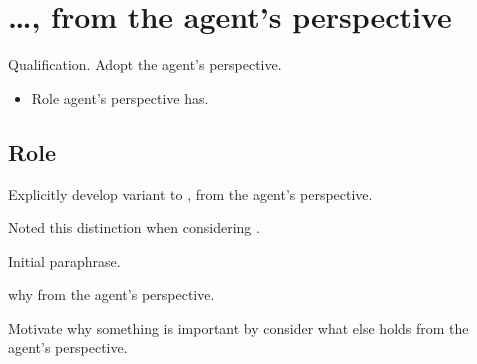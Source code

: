 \section{\dots, from the agent's perspective}
\label{cha:introduction:sec:agents-perspective}

\begin{note}
  Qualification.
  Adopt the agent's perspective.

  \begin{itemize}
  \item
    Role agent's perspective has.
  \end{itemize}
\end{note}


\subsection{Role}
\label{sec:role}

\begin{note}
  Explicitly develop variant to \qWhy{}, from the agent's perspective.

  Noted this distinction when considering \citeauthor{Davidson:1963aa}.

  Initial paraphrase.

  why from the agent's perspective.

  Motivate why something is important by consider what else holds from the agent's perspective.
\end{note}

